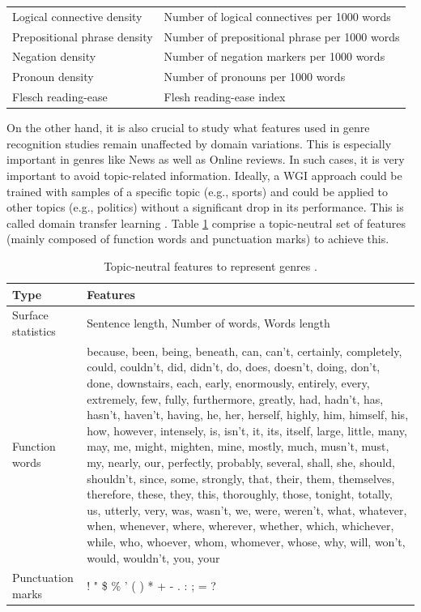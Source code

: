 \begin{table}[t]
\begin{tabular}{p{4cm}p{8cm}}
        Logical connective density & Number of logical connectives per 1000 words \\
        Prepositional phrase density & Number of prepositional phrase per 1000 words \\
        Negation density & Number of negation markers per 1000 words \\
        Pronoun density & Number of pronouns per 1000 words \\
        Flesch reading-ease & Flesh reading-ease index \\
        \hline
	\end{tabular}
\end{table}

On the other hand, it is also crucial to study what features used in genre recognition studies remain unaffected by domain variations. This is especially important in genres like News as well as Online reviews. In such cases, it is very important to avoid topic-related information. Ideally, a WGI approach could be trained with samples of a specific topic (e.g., sports) and could be applied to other topics (e.g., politics) without a significant drop in its performance. This is called {domain transfer} learning \parencite{finn2006learning}. Table \ref{chap:relevant_work:tbl:domain_trans_text_statistics} comprise a topic-neutral set of features (mainly composed of function words and punctuation marks) to achieve this. 

\begin{table}[t]
	\center
	\caption {Topic-neutral features to represent genres \parencite{finn2006learning}.}\label{chap:relevant_work:tbl:domain_trans_text_statistics}
	\begin{tabular}{p{3cm}p{11cm}}
		\hline
		Type & Features\\
		\hline
		 Surface statistics & Sentence length, Number of words, Words length \\
         Function words & because, been, being, beneath, can, can’t, certainly, completely, could, couldn’t, did, didn’t, do, does, doesn’t, doing, don’t, done, downstairs, each, early, enormously, entirely, every, extremely, few, fully, furthermore, greatly, had, hadn’t, has, hasn’t, haven’t, having, he, her, herself, highly, him, himself, his, how, however, intensely, is, isn’t, it, its, itself, large, little, many, may, me, might, mighten, mine, mostly, much, musn’t, must, my, nearly, our, perfectly, probably, several, shall, she, should, shouldn’t, since, some, strongly, that, their, them, themselves, therefore, these, they, this, thoroughly, those, tonight, totally, us, utterly, very, was, wasn’t, we, were, weren’t, what, whatever, when, whenever, where, wherever, whether, which, whichever, while, who, whoever, whom, whomever, whose, why, will, won’t, would, wouldn’t, you, your \\
         Punctuation marks  & ! " \$ \% ' ( ) * + - . : ; = ? \\
  		\hline
	\end{tabular}
\end{table}

